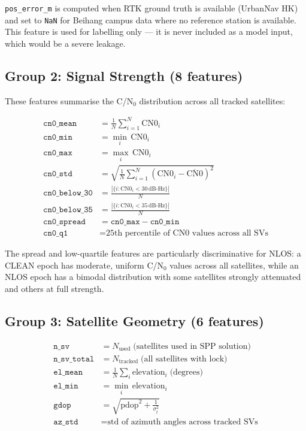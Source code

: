 \documentclass[12pt,a4paper]{article}
\newcommand{\code}[1]{\texttt{#1}}
\begin{document}
\code{pos\_error\_m} is computed when RTK ground truth is available (UrbanNav HK) and set
to \code{NaN} for Beihang campus data where no reference station is available.
This feature is used for labelling only --- it is never included as a model input, which
would be a severe leakage.

\subsection{Group 2: Signal Strength (8 features)}

These features summarise the C/N$_0$ distribution across all tracked satellites:

\begin{align}
  \code{cn0\_mean}       &= \frac{1}{N}\sum_{i=1}^N \text{CN0}_i \\[4pt]
  \code{cn0\_min}        &= \min_i \,\text{CN0}_i \\[4pt]
  \code{cn0\_max}        &= \max_i \,\text{CN0}_i \\[4pt]
  \code{cn0\_std}        &= \sqrt{\frac{1}{N}\sum_{i=1}^N (\text{CN0}_i - \overline{\text{CN0}})^2} \\[4pt]
  \code{cn0\_below\_30}  &= \frac{|\{i : \text{CN0}_i < 30\,\text{dB-Hz}\}|}{N} \\[4pt]
  \code{cn0\_below\_35}  &= \frac{|\{i : \text{CN0}_i < 35\,\text{dB-Hz}\}|}{N} \\[4pt]
  \code{cn0\_spread}     &= \code{cn0\_max} - \code{cn0\_min} \\[4pt]
  \code{cn0\_q1}         &= \text{25th percentile of CN0 values across all SVs}
\end{align}

The spread and low-quartile features are particularly discriminative for NLOS:
a CLEAN epoch has moderate, uniform C/N$_0$ values across all satellites, while an NLOS
epoch has a bimodal distribution with some satellites strongly attenuated and others at
full strength.

\subsection{Group 3: Satellite Geometry (6 features)}

\begin{align}
  \code{n\_sv}            &= N_\mathrm{used}\;\text{(satellites used in SPP solution)} \\
  \code{n\_sv\_total}     &= N_\mathrm{tracked}\;\text{(all satellites with lock)} \\
  \code{el\_mean}         &= \frac{1}{N}\sum_i \text{elevation}_i\;\text{(degrees)} \\
  \code{el\_min}          &= \min_i\,\text{elevation}_i \\
  \code{gdop}             &= \sqrt{\mathrm{pdop}^2 + \frac{1}{\sigma_t^2}} \\
  \code{az\_std}          &= \text{std of azimuth angles across tracked SVs}
\end{align}
\end{document}
